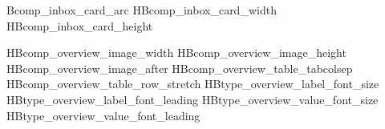 \expandafter\providecommand\csname HBcomp_inbox_card_arc\endcsname{2.4mm}
\expandafter\providecommand\csname HBcomp_inbox_card_width
\expandafter\providecommand\csname HBcomp_inbox_card_height\endcsname{60.6mm}

\newcommand{\HBInBoxThree}[6]{%
  \par\noindent
  \makebox[\linewidth][s]{%
    \HBInBoxCard{1}{#1}{#2}\hfill
    \HBInBoxCard{2}{#3}{#4}\hfill
    \HBInBoxCard{3}{#5}{#6}%
  }%
  \par
}

\expandafter\providecommand\csname HBcomp_overview_image_width
\expandafter\providecommand\csname HBcomp_overview_image_height\endcsname{34mm}
\expandafter\providecommand\csname HBcomp_overview_image_after\endcsname{0.8mm}
\expandafter\providecommand\csname HBcomp_overview_table_tabcolsep\endcsname{2.2pt}
\expandafter\providecommand\csname HBcomp_overview_table_row_stretch
\expandafter\providecommand\csname HBtype_overview_label_font_size\endcsname{5.9pt}
\expandafter\providecommand\csname HBtype_overview_label_font_leading\endcsname{6.5pt}
\expandafter\providecommand\csname HBtype_overview_value_font_size\endcsname{5.7pt}
\expandafter\providecommand\csname HBtype_overview_value_font_leading\endcsname{6.3pt}

\providecommand{\HBTypeOverviewLabel}[1]{%
  {\HBFontSemiBold
   \color{\csname HBtype_body_color\endcsname}%
   \fontsize{\csname HBtype_overview_label_font_size\endcsname}
            {\csname HBtype_overview_label_font_leading\endcsname}\selectfont
   \RaggedRight #1}%
}

\providecommand{\HBTypeOverviewValue}[1]{%
  {\HBFontRegular
   \color{\csname HBtype_body_color\endcsname}%
   \fontsize{\csname HBtype_overview_value_font_size\endcsname}
            {\csname HBtype_overview_value_font_leading\endcsname}\selectfont
   \RaggedRight #1}%
}

\providecommand{\HBOverviewCell}[2]{%
  \begin{minipage}[t]{\linewidth}
    \HBIfBlankTF{#1}{}{\HBTypeOverviewLabel{#1}}%
    \HBIfBlankTF{#2}{}{%
      \HBIfBlankTF{#1}{}{\par\vspace{0.25mm}}%
      \HBTypeOverviewValue{#2}%
    }%
  \end{minipage}%
}

